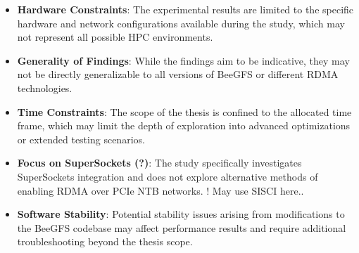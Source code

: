 \begin{itemize}
    \item \textbf{Hardware Constraints}: The experimental results are limited to the specific hardware and network configurations available during the study, which may not represent all possible HPC environments.
    \item \textbf{Generality of Findings}: While the findings aim to be indicative, they may not be directly generalizable to all versions of BeeGFS or different RDMA technologies.
    \item \textbf{Time Constraints}: The scope of the thesis is confined to the allocated time frame, which may limit the depth of exploration into advanced optimizations or extended testing scenarios.
    \item \textbf{Focus on SuperSockets (?)}: The study specifically investigates SuperSockets integration and does not explore alternative methods of enabling RDMA over PCIe NTB networks. ! May use SISCI here..
    \item \textbf{Software Stability}: Potential stability issues arising from modifications to the BeeGFS codebase may affect performance results and require additional troubleshooting beyond the thesis scope.
\end{itemize}
